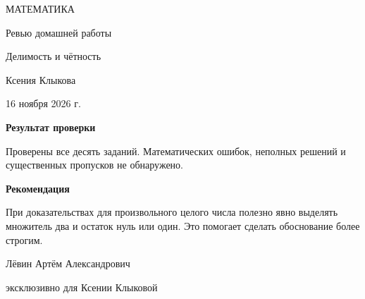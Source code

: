 \documentclass[a4paper,12pt]{article}
\begin{document}
\begin{center}
\vspace*{28mm}
{\small\color{accent} МАТЕМАТИКА\par}
\vspace{15mm}
{\LARGE Ревью домашней работы\par}
\vspace{8mm}
{\Large\color{accent} Делимость и чётность\par}
\vspace{21mm}
{\large Ксения Клыкова\par}
\vspace{5mm}
16 ноября 2026 г.\par
\vfill
\begin{minipage}{0.78\linewidth}
\centering
{\large\bfseries Результат проверки\par}
\vspace{6mm}
Проверены все десять заданий. Математических ошибок,
неполных решений и существенных пропусков не обнаружено.\par
\vspace{6mm}
{\color{accent}\bfseries Рекомендация}\par
\vspace{2mm}
При доказательствах для произвольного целого числа полезно
явно выделять множитель два и остаток нуль или один.
Это помогает сделать обоснование более строгим.\par
\end{minipage}
\vfill
{\small Лёвин Артём Александрович\par}
\vspace{1mm}
{\small эксклюзивно для Ксении Клыковой\par}
\vspace{17mm}
\end{center}
\end{document}
